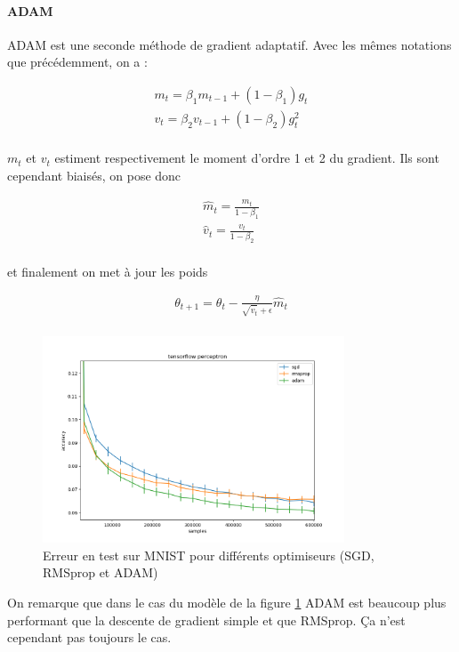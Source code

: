 \paragraph{ADAM}
ADAM est une seconde méthode de gradient adaptatif. Avec les mêmes notations que précédemment, on a :

\begin{align*}
m_t = \beta_1 m_{t-1} + (1- \beta_1)g_t \\
v_t = \beta_2 v_{t-1} + (1- \beta_2)g_t^2 \\
\end{align*}

$m_t$ et $v_t$ estiment respectivement le moment d'ordre 1 et 2 du gradient.
Ils sont cependant biaisés, on pose donc

\begin{align*}
\hat{m}_t = \frac{m_t}{1 - \beta_1} \\
\hat{v}_t = \frac{v_t}{1 - \beta_2} \\
\end{align*}

et finalement on met à jour les poids

\begin{align*}
\theta_{t+1} = \theta_t - \frac{\eta}{\sqrt{ \hat{v}_t } + \epsilon} \hat{m}_t \\
\end{align*}

\begin{figure}[ht]
 \centering
 \includegraphics[width=0.8\textwidth]{img/sgd_rmsprop_adam.png}
 \caption{Erreur en test sur MNIST pour différents optimiseurs (SGD, RMSprop et ADAM)}
 \label{fig:sgd_rmsprop_adam}
\end{figure}

On remarque que dans le cas du modèle de la figure \ref{fig:sgd_rmsprop_adam} ADAM est beaucoup plus performant que la descente de gradient simple et que RMSprop. Ça n'est cependant pas toujours le cas.


